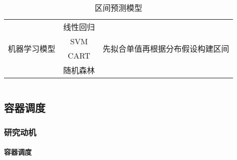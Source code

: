 \begin{frame}
{\begin{columns}
\begin{column}{0.6\textwidth}
\begin{table}[hftb]
{\begin{tabular}{ccl}
            \midrule
            \multirow{4}{*}{机器学习模型} & 线性回归 & \multirow{4}{*}{先拟合单值再根据分布假设构建区间}\\
            ~ & SVM & \\
            ~ & CART & \\
            ~ & 随机森林 & \\
            \bottomrule
        \end{tabular}
    }
    \caption{区间预测模型}
    \end{table}
\end{column}
\begin{column}{0.3\textwidth}
\end{column}
\end{columns}
}
\end{frame}

\subsection{容器调度}

\begin{frame}
\frametitle{研究动机}
\framesubtitle{容器调度}
\end{frame}